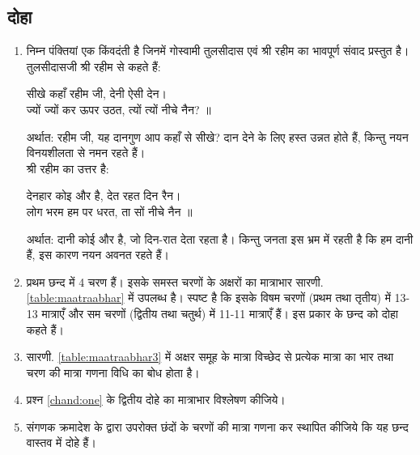 \subsection{दोहा}
\renewcommand{\theequation}{\theenumi}
\renewcommand{\thefigure}{\theenumi}
\begin{enumerate}[label=\thesubsection.\arabic*.,ref=\thesubsection.\theenumi]
\item   निम्न पंक्तियां एक किंवदंती है जिनमें  गोस्वामी तुलसीदास एवं श्री रहीम का  भावपूर्ण संवाद प्रस्तुत है।   तुलसीदासजी श्री रहीम से कहते हैं:
\label{chand:one}
\begin{flushleft}
सीखे कहाँ रहीम जी, देनी ऐसी देन। 
\\
ज्यों ज्यों कर ऊपर उठत, त्यों त्यों नीचे नैन? ॥
\end{flushleft}
अर्थात: रहीम जी, यह दानगुण आप कहाँ से सीखे? दान देने के लिए हस्त उन्नत होते हैं, किन्तु नयन विनयशीलता  से नमन रहते  हैं। 
\\
श्री रहीम का उत्तर है:
\begin{flushleft}
देनहार कोइ और है,  देत रहत दिन रैन। 
\\
लोग भरम हम पर धरत, ता सों नीचे नैन ॥
\end{flushleft}
अर्थात: दानी कोई और है, जो दिन-रात देता रहता है। किन्तु जनता इस भ्रम में रहती है कि हम दानी हैं, इस कारण नयन अवनत रहते हैं। 
\item प्रथम छन्द  में 4 चरण हैं।   इसके समस्त चरणों  के अक्षरों का मात्राभार सारणी. \ref{table:maatraabhar} में उपलब्ध है। 
स्पष्ट है कि इसके विषम चरणों (प्रथम तथा तृतीय) में 13-13 मात्राएँ और सम चरणों (द्वितीय तथा चतुर्थ) में 11-11 मात्राएँ हैं। इस प्रकार के छन्द को दोहा कहते हैं। 
\begin{table}[!ht]
\centering

\caption{}
\label{table:maatraabhar}
\end{table}
\item  सारणी. \ref{table:maatraabhar3} में अक्षर समूह के मात्रा विच्छेद से प्रत्येक मात्रा का भार तथा चरण की मात्रा गणना विधि का बोध होता है। 
\begin{table}[!ht]
\centering

\caption{}
\label{table:maatraabhar3}
\end{table}

\item प्रश्न \ref{chand:one} के द्वितीय दोहे का मात्राभार विश्लेषण कीजिये। 
\item संगणक क्रमादेश के द्वारा उपरोक्त छंदों  के चरणों की मात्रा गणना कर स्थापित कीजिये कि यह छन्द वास्तव में दोहे हैं। 
\end{enumerate}

